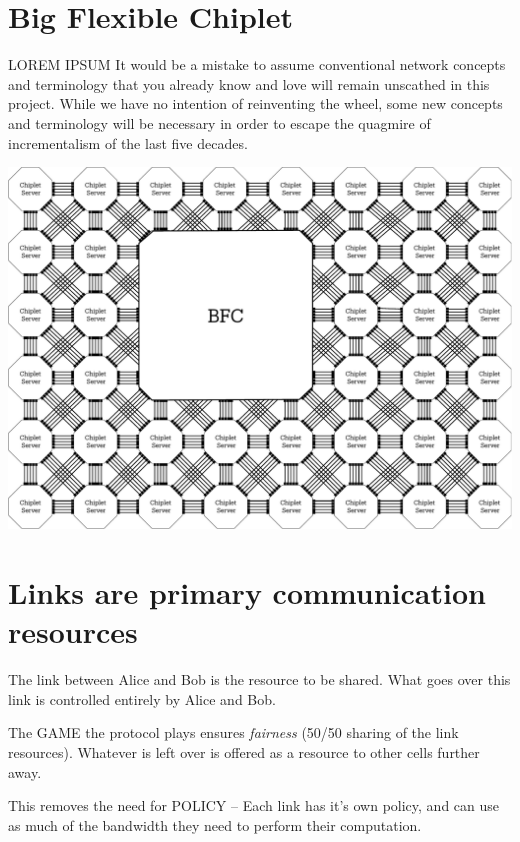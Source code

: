 \section{Big Flexible Chiplet}

LOREM IPSUM It would be a mistake to assume conventional network concepts and terminology that you already know and love will remain unscathed in this project. While we have no intention of reinventing the wheel,  some new concepts and terminology will be necessary in order to escape the quagmire of incrementalism of the last five decades.  



 \begin{marginfigure}
  \includegraphics[width=1.2\linewidth]{../../FIGURES/Big-Flexible-Chipet.pdf}
      \vspace{2em}
\end{marginfigure}


\clearpage
\section{Links are primary communication resources}

The link between Alice and Bob is the resource to be shared.  What goes over this link is controlled entirely by Alice and Bob.

The GAME the protocol plays ensures \emph{fairness} (50/50 sharing of the link resources). Whatever is left over is offered as a resource to other cells further away.

This removes the need for POLICY -- Each link has it's own policy, and can use as much of the bandwidth they need to perform their computation.

